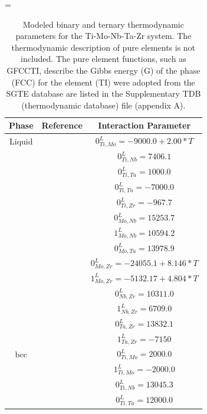 \newpage
\LTcapwidth=\textwidth
\begin{longtable}[H]{ c c c }
	\caption{Modeled binary and ternary thermodynamic parameters for the Ti-Mo-Nb-Ta-Zr system. The thermodynamic description of pure elements is not included. The pure element functions, such as GFCCTI, describe the Gibbs energy (G) of the phase (FCC) for the element (TI) were adopted from the SGTE database \cite{Dinsdale1991} are listed in the Supplementary TDB (thermodynamic database) file (appendix A).} \label{Ch3-table:ip}\\
		\hline
		Phase & Reference & Interaction Parameter\\
		\hline
		\endhead
		\hline
		\endfoot
		Liquid & \cite{Ansara1998} & $0^\textit{L}_{Ti,Mo} = -9000.0+2.00*T$\\
		          & \cite{Zhang2001} & $0^\textit{L}_{Ti,Nb} = 7406.1$\\
		          & \cite{Ansara1998} & $0^\textit{L}_{Ti,Ta} = 1000.0$\\
		          & \cite{Ansara1998} & $0^\textit{L}_{Ti,Ta} = -7000.0$\\
		          & \cite{Kumar1994a} & $0^\textit{L}_{Ti,Zr} = -967.7$\\
		          & \cite{Xiong2004} & $0^\textit{L}_{Mo,Nb} = 15253.7$\\
		          & \cite{Xiong2004} & $1^\textit{L}_{Mo,Nb} = 10594.2$\\
		          & \cite{Xiong2004} & $0^\textit{L}_{Mo,Ta} = 13978.9$\\
		          & \cite{Perez2003} & $0^\textit{L}_{Mo,Zr} = -24055.1+8.146*T$\\
		          & \cite{Perez2003} & $1^\textit{L}_{Mo,Zr} = -5132.17+4.804*T$\\
		          & \cite{Guillermet1991} & $0^\textit{L}_{Nb,Zr} = 10311.0$\\
		          & \cite{Guillermet1991} & $1^\textit{L}_{Nb,Zr} = 6709.0$\\
		          & \cite{Guillermet1995} & $0^\textit{L}_{Ta,Zr} = 13832.1$\\
		          & \cite{Guillermet1995} & $1^\textit{L}_{Ta,Zr} = -7150$\\
          bcc & \cite{Ansara1998} & $0^\textit{L}_{Ti,Mo} = 2000.0$\\
                  & \cite{Ansara1998} & $1^\textit{L}_{Ti,Mo} = -2000.0$\\
                  & \cite{Zhang2001} & $0^\textit{L}_{Ti,Nb} = 13045.3$\\
                  & \cite{Ansara1998} & $0^\textit{L}_{Ti,Ta} = 12000.0$\\

\end{longtable}
